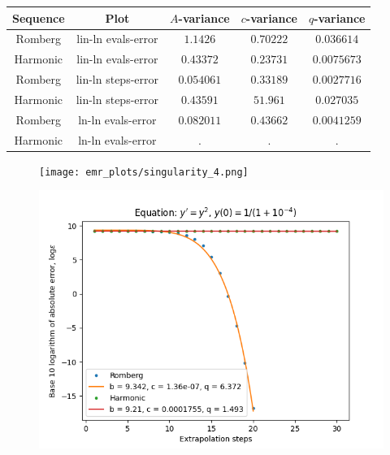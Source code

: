 \begin{table}[H]
    \centering
    \begin{tabular}{c|c||c|c|c}
Sequence & Plot & \(A\)-variance & \(c\)-variance & \(q\)-variance\\\hline
Romberg & lin-ln evals-error & \(1.1426\) & \(0.70222\) & \(0.036614\) \\
Harmonic & lin-ln evals-error & \(0.43372\) & \(0.23731\) & \(0.0075673\) \\
Romberg & lin-ln steps-error & \(0.054061\) & \(0.33189\) & \(0.0027716\) \\
Harmonic & lin-ln steps-error & \(0.43591\) & \(51.961\) & \(0.027035\) \\
Romberg & ln-ln evals-error & \(0.082011\) & \(0.43662\) & \(0.0041259\) \\
Harmonic & ln-ln evals-error & . & . & . \\
    \end{tabular}
    \label{tab:my_label}
\end{table}

\begin{figure}[H]
\centering
\begin{minipage}{0.45\textwidth}
\centering
\texttt{[image: emr\_plots/singularity\_4.png]}
\end{minipage}
\begin{minipage}{0.45\textwidth}
\centering
\includegraphics[scale=0.45]{emr_plots/singularity_4_hp_steps.png}
\end{minipage}
\end{figure}

